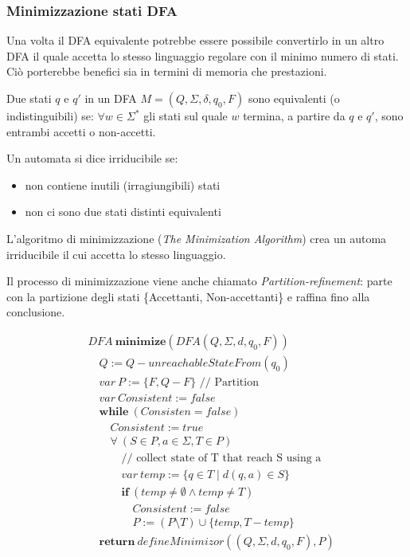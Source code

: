 \subsubsection{Minimizzazione stati DFA}
Una volta il DFA equivalente potrebbe essere possibile convertirlo in un altro
DFA il quale accetta lo stesso linguaggio regolare con il minimo numero di
stati. Ciò porterebbe benefici sia in termini di memoria che prestazioni.

\begin{definition}
Due stati $q$ e $q'$ in un DFA $M = (Q,\Sigma,\delta,q_0,F)$ sono equivalenti
(o indistinguibili) se: $\forall w \in \Sigma^*$ gli stati sul quale
$w$ termina, a partire da $q$ e $q'$, sono entrambi accetti o non-accetti.
\end{definition}

\begin{definition}
Un automata si dice irriducibile se:
\begin{itemize}
\item non contiene inutili (irragiungibili) stati
\item non ci sono due stati distinti equivalenti
\end{itemize}
\end{definition}
\bigskip
L'algoritmo di minimizzazione (\textit{The Minimization Algorithm}) crea un
automa irriducibile il cui accetta lo stesso linguaggio.

Il processo di minimizzazione viene anche chiamato
\textit{Partition-refinement}: parte con la partizione degli stati
\{Accettanti, Non-accettanti\} e raffina fino alla conclusione.

\begin{align*}
& DFA \ \mathbf{minimize}(DFA(Q,\Sigma,d,q_0,F))                            \\
& \quad Q := Q - unreachableStateFrom(q_0)                                  \\
& \quad var \ P := \{F,Q-F\} \text{ // Partition }                          \\
& \quad var \ Consistent := false                                           \\
& \quad \mathbf{while} \ (Consisten = false)                                \\
& \qquad Consistent := true                                                 \\
& \qquad \forall \ (S \in P, a \in \Sigma, T \in P)                         \\
& \qquad \quad \text{// collect state of T that reach S using a}            \\
& \qquad \quad var \ temp := \{q \in T \mid d(q,a) \in S\}                  \\
& \qquad \quad \mathbf{if} \ (temp \neq \emptyset \wedge temp \neq T)       \\
& \qquad \qquad Consistent := false                                         \\
& \qquad \qquad P := (P \setminus {T}) \cup \{temp,T-temp\}                 \\
& \quad \mathbf{return} \ defineMinimizor((Q,\Sigma,d,q_0,F),P)
\end{align*}

